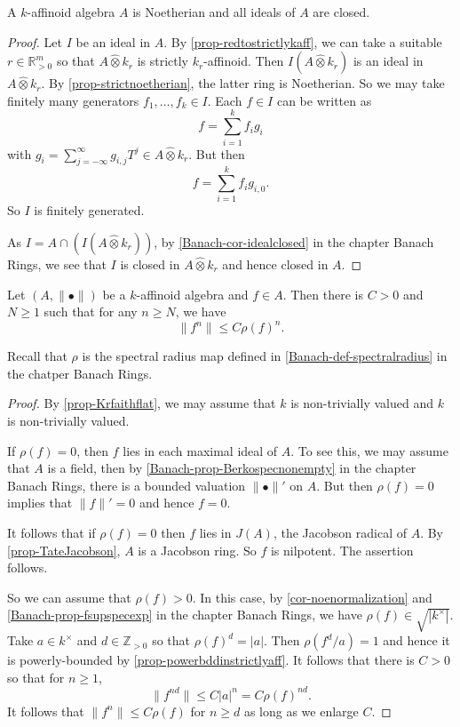 \begin{thm}\label{thm-affnoetherian}
A $k$-affinoid algebra $A$ is Noetherian and all ideals of $A$ are closed.  
\end{thm}
\begin{proof}
    Let $I$ be an ideal in $A$. 
    By \cref{prop-redtostrictlykaff}, we can take a suitable $r\in \mathbb{R}^m_{>0}$ so that $A\hat{\otimes} k_r$ is strictly $k_r$-affinoid. Then $I (A\hat{\otimes} k_r)$ is an ideal in $A\hat{\otimes} k_r$. By \cref{prop-strictnoetherian}, the latter ring is Noetherian. So we may take finitely many generators $f_1,\ldots,f_k\in I$. Each $f\in I$ can be written as 
    \[
        f=\sum_{i=1}^k f_i g_i  
    \]
    with $g_i=\sum_{j=-\infty}^{\infty}g_{i,j}T^j\in A\hat{\otimes} k_r$. But then 
    \[
        f=\sum_{i=1}^k f_i g_{i,0}.  
    \]
    So $I$ is finitely generated.

    As $I=A\cap (I (A\hat{\otimes} k_r))$, by \cref{Banach-cor-idealclosed} in the chapter Banach Rings, we see that $I$ is closed in $A\hat{\otimes} k_r$ and hence closed in $A$.
\end{proof}

\begin{proposition}\label{prop-fnnormbyrho}
    Let $(A,\|\bullet\|)$ be a $k$-affinoid algebra and $f\in A$. Then there is $C>0$ and $N\geq 1$ such that for any $n\geq N$, we have
    \[
        \|f^n\|\leq C\rho(f)^n.  
    \]
\end{proposition}
Recall that $\rho$ is the spectral radius map defined in \cref{Banach-def-spectralradius} in the chatper Banach Rings.
\begin{proof}
    By \cref{prop-Krfaithflat}, we may assume that $k$ is non-trivially valued and $k$ is non-trivially valued.
    
    If $\rho(f)=0$, then $f$ lies in each maximal ideal of $A$. To see this, we may assume that $A$ is a field, then by \cref{Banach-prop-Berkospecnonempty} in the chapter Banach Rings, there is a bounded valuation $\|\bullet\|'$ on $A$. But then $\rho(f)=0$ implies that $\|f\|'=0$ and hence $f=0$.

    It follows that if $\rho(f)=0$ then $f$ lies in $J(A)$, the Jacobson radical of $A$. By \cref{prop-TateJacobson}, $A$ is a Jacobson ring. So $f$ is nilpotent. The assertion follows.

    So we can assume that $\rho(f)>0$. In this case, by \cref{cor-noenormalization} and \cref{Banach-prop-fsupspecexp} in the chapter Banach Rings, we have $\rho(f)\in \sqrt{|k^{\times}|}$. Take $a\in k^{\times}$ and $d\in \mathbb{Z}_{>0}$ so that $\rho(f)^d=|a|$. Then $\rho(f^d/a)=1$ and hence it is powerly-bounded by \cref{prop-powerbddinstrictlyaff}. It follows that there is $C>0$ so that for $n\geq 1$, 
    \[
        \|f^{nd}\|\leq C |a|^n=C\rho(f)^{nd}. 
    \]
    It follows that $\|f^n\|\leq C\rho(f)$ for $n\geq d$ as long as we enlarge $C$.
\end{proof}


